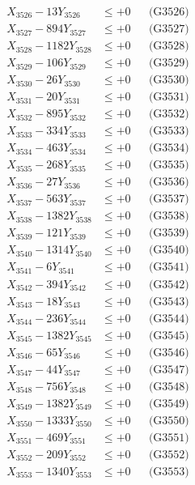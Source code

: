 \documentclass[a4paper,10pt]{article}
\begin{document}
{\begin{align}
X_{3526} - 13Y_{3526} &\leq +0 && \text{(G3526)} \\
X_{3527} - 894Y_{3527} &\leq +0 && \text{(G3527)} \\
X_{3528} - 1182Y_{3528} &\leq +0 && \text{(G3528)} \\
X_{3529} - 106Y_{3529} &\leq +0 && \text{(G3529)} \\
X_{3530} - 26Y_{3530} &\leq +0 && \text{(G3530)} \\
\allowbreak
X_{3531} - 20Y_{3531} &\leq +0 && \text{(G3531)} \\
X_{3532} - 895Y_{3532} &\leq +0 && \text{(G3532)} \\
X_{3533} - 334Y_{3533} &\leq +0 && \text{(G3533)} \\
X_{3534} - 463Y_{3534} &\leq +0 && \text{(G3534)} \\
X_{3535} - 268Y_{3535} &\leq +0 && \text{(G3535)} \\
X_{3536} - 27Y_{3536} &\leq +0 && \text{(G3536)} \\
X_{3537} - 563Y_{3537} &\leq +0 && \text{(G3537)} \\
X_{3538} - 1382Y_{3538} &\leq +0 && \text{(G3538)} \\
X_{3539} - 121Y_{3539} &\leq +0 && \text{(G3539)} \\
X_{3540} - 1314Y_{3540} &\leq +0 && \text{(G3540)} \\
\allowbreak
X_{3541} - 6Y_{3541} &\leq +0 && \text{(G3541)} \\
X_{3542} - 394Y_{3542} &\leq +0 && \text{(G3542)} \\
X_{3543} - 18Y_{3543} &\leq +0 && \text{(G3543)} \\
X_{3544} - 236Y_{3544} &\leq +0 && \text{(G3544)} \\
X_{3545} - 1382Y_{3545} &\leq +0 && \text{(G3545)} \\
X_{3546} - 65Y_{3546} &\leq +0 && \text{(G3546)} \\
X_{3547} - 44Y_{3547} &\leq +0 && \text{(G3547)} \\
X_{3548} - 756Y_{3548} &\leq +0 && \text{(G3548)} \\
X_{3549} - 1382Y_{3549} &\leq +0 && \text{(G3549)} \\
X_{3550} - 1333Y_{3550} &\leq +0 && \text{(G3550)} \\
\allowbreak
X_{3551} - 469Y_{3551} &\leq +0 && \text{(G3551)} \\
X_{3552} - 209Y_{3552} &\leq +0 && \text{(G3552)} \\
X_{3553} - 1340Y_{3553} &\leq +0 && \text{(G3553)} \\

\end{align}}
\end{document}

